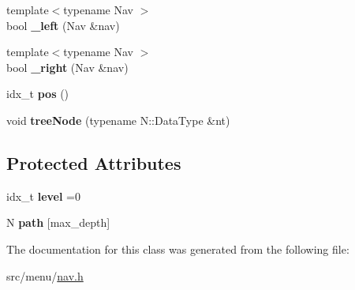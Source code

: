 \begin{DoxyCompactItemize}
{\footnotesize template$<$typename Nav $>$ }\\bool {\bfseries \+\_\+left} (Nav \&nav)
\item 
\mbox{\label{classNavTree_a5528f862313134c883e14dfeff1e5560}} 
{\footnotesize template$<$typename Nav $>$ }\\bool {\bfseries \+\_\+right} (Nav \&nav)
\item 
\mbox{\label{classNavTree_ab00a434221b19a4351e946c4759d3e7e}} 
idx\+\_\+t {\bfseries pos} ()
\item 
\mbox{\label{classNavTree_a66670128132d5c1bc9f93b403b2ea9ac}} 
void {\bfseries tree\+Node} (typename N\+::\+Data\+Type \&nt)
\end{DoxyCompactItemize}
\subsection*{Protected Attributes}
\begin{DoxyCompactItemize}
\item 
\mbox{\label{classNavTree_a27aac1d9c1e8950117be9cf1ddb651ea}} 
idx\+\_\+t {\bfseries level} =0
\item 
\mbox{\label{classNavTree_ac126ae570de8d578a4c908797fcf1af0}} 
N {\bfseries path} \mbox{[}max\+\_\+depth\mbox{]}
\end{DoxyCompactItemize}


The documentation for this class was generated from the following file\+:\begin{DoxyCompactItemize}
\item 
src/menu/\hyperlink{nav_8h}{nav.\+h}\end{DoxyCompactItemize}
